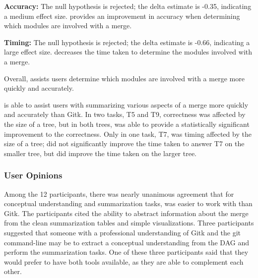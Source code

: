 \begin{itemize}
    \textbf{Accuracy:} The null hypothesis is rejected; the delta
    estimate is -0.35, indicating a medium effect size. \tool provides
    an improvement in accuracy when determining which modules are
    involved with a merge.

    \textbf{Timing:} The null hypothesis is rejected; the delta estimate
    is -0.66, indicating a large effect size. \tool decreases the time
    taken to determine the modules involved with a merge.

    Overall, \tool assists users determine which modules are involved
    with a merge more quickly and accurately.

\end{itemize}

\tool is able to assist users with summarizing various aspects of a
merge more quickly and accurately than Gitk. In two tasks, T5 and T9,
correctness was affected by the size of a tree, but in both trees, \tool
was able to provide a statistically significant improvement to the
correctness. Only in one task, T7, was timing affected by the size of a
tree; \tool did not significantly improve the time taken to answer T7 on
the smaller tree, but did improve the time taken on the larger tree.

\subsubsection{User Opinions}
\label{sub:user_opinions}

Among the 12 participants, there was nearly unanimous agreement that
for conceptual understanding and summarization tasks, \tool was easier
to work with than Gitk. The participants cited the ability to abstract
information about the merge from the clean summarization tables and
simple visualizations. Three participants suggested that someone with a
professional understanding of Gitk and the git command-line may be to
extract a conceptual understanding from the DAG and perform the
summarization tasks. One of these three participants said that they
would prefer to have both tools available, as they are able to
complement each other.
